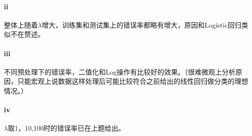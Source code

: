 \documentclass[hyperref,UTF8]{ctexart}
\begin{document}
\paragraph{ii}整体上随着$\lambda$增大，训练集和测试集上的错误率都略有增大，原因和Logistic回归类似不在赘述。
\paragraph{iii}不同预处理下的错误率，二值化和Log操作有比较好的效果。（很难微观上分析原因，只能宏观上说数据这样处理后可能比较符合之前给出的线性回归做分类的理想情况。）
\begin{table}[!htbp]
  \centering
\caption{不同预处理下错误率LinearRegression}
\label{tb:lda_knn}
\end{table}

\paragraph{iv}$\lambda$取1，10,100时的错误率已在上题给出。
\end{document}
